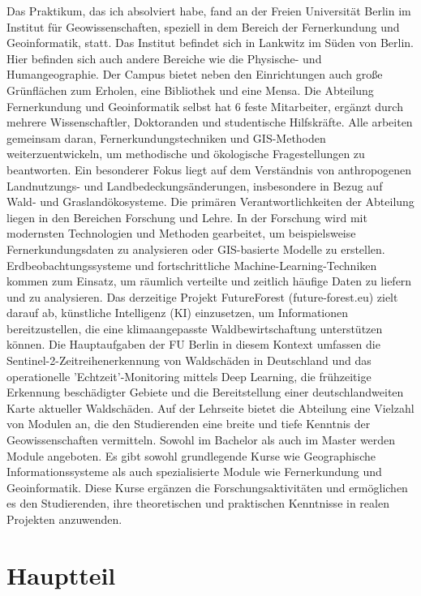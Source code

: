 \documentclass[12pt,a4paper]{report}
\begin{document}
\onehalfspacing
Das Praktikum, das ich absolviert habe, fand an der Freien Universität Berlin
im Institut für Geowissenschaften, speziell in dem Bereich der Fernerkundung
und Geoinformatik, statt. Das Institut befindet sich in Lankwitz im Süden von
Berlin. Hier befinden sich auch andere Bereiche wie die Physische- und
Humangeographie. Der Campus bietet neben den Einrichtungen auch große
Grünflächen zum Erholen, eine Bibliothek und eine Mensa. Die Abteilung
Fernerkundung und Geoinformatik selbst hat 6 feste Mitarbeiter, ergänzt durch
mehrere Wissenschaftler, Doktoranden und studentische Hilfskräfte. Alle
arbeiten gemeinsam daran, Fernerkundungstechniken und GIS-Methoden
weiterzuentwickeln, um methodische und ökologische Fragestellungen zu
beantworten. Ein besonderer Fokus liegt auf dem Verständnis von anthropogenen
Landnutzungs- und Landbedeckungsänderungen, insbesondere in Bezug auf Wald- und
Graslandökosysteme.
Die primären Verantwortlichkeiten der Abteilung liegen in den Bereichen
Forschung und Lehre. 
%
In der Forschung wird mit modernsten Technologien und Methoden gearbeitet, um
beispielsweise Fernerkundungsdaten zu analysieren oder GIS-basierte Modelle zu
erstellen. Erdbeobachtungssysteme und fortschrittliche
Machine-Learning-Techniken kommen zum Einsatz, um räumlich verteilte und
zeitlich häufige Daten zu liefern und zu analysieren.
%
Das derzeitige Projekt FutureForest (future-forest.eu) zielt darauf ab,
künstliche Intelligenz (KI) einzusetzen, um Informationen bereitzustellen, die
eine klimaangepasste Waldbewirtschaftung unterstützen können. Die Hauptaufgaben
der FU Berlin in diesem Kontext umfassen die Sentinel-2-Zeitreihenerkennung von
Waldschäden in Deutschland und das operationelle 'Echtzeit'-Monitoring mittels
Deep Learning, die frühzeitige Erkennung beschädigter Gebiete und die
Bereitstellung einer deutschlandweiten Karte aktueller Waldschäden. 
%
Auf der Lehrseite bietet die Abteilung eine Vielzahl von Modulen an, die den
Studierenden eine breite und tiefe Kenntnis der Geowissenschaften vermitteln.
Sowohl im Bachelor als auch im Master werden Module angeboten.  Es gibt sowohl
grundlegende Kurse wie Geographische Informationssysteme als auch
spezialisierte Module wie Fernerkundung und Geoinformatik. Diese Kurse ergänzen
die Forschungsaktivitäten und ermöglichen es den Studierenden, ihre
theoretischen und praktischen Kenntnisse in realen Projekten anzuwenden.

\chapter{Hauptteil}
\end{document}
